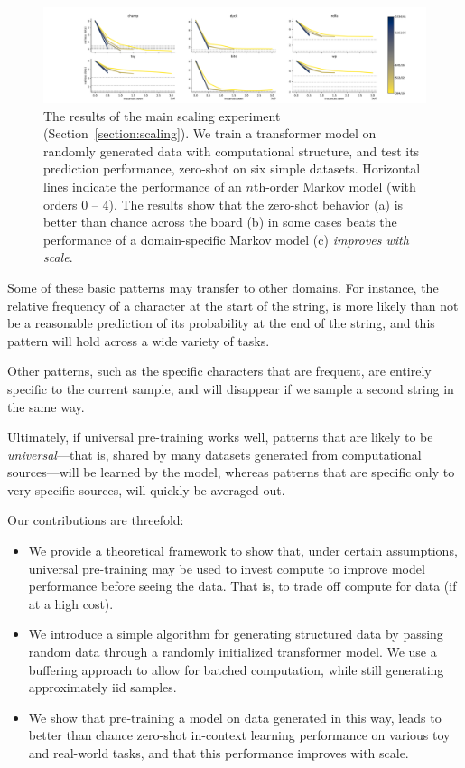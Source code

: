 \documentclass{article} %
\begin{document}
\begin{figure}[t!]

  \centerline{\hspace{-1.2em}
    \includegraphics[width=1.3\textwidth]{./figures/scaling.pdf}
  }
  \caption{The results of the main scaling experiment (Section~\ref{section:scaling}). We train a transformer model on randomly generated data with computational structure, and test its prediction performance, zero-shot on six simple datasets. Horizontal lines indicate the performance of an $n$th-order Markov model (with orders $0$ -- $4$). The results show that the zero-shot behavior (a) is better than chance across the board (b) in some cases beats the performance of a domain-specific Markov model (c) \emph{improves with scale}.}
  \label{figure:scaling}
\end{figure}

Some of these basic patterns may transfer to other domains. For instance, the relative frequency of a character at the start of the string, is more likely than not be a reasonable prediction of its probability at the end of the string, and this pattern will hold across a wide variety of tasks.

 Other patterns, such as the specific characters that are frequent, are entirely specific to the current sample, and will disappear if we sample a second string in the same way.

Ultimately, if universal pre-training works well, patterns that are likely to be \emph{universal}---that is, shared by many datasets generated from computational sources---will be learned by the model, whereas patterns that are specific only to very specific sources, will quickly be averaged out. 

Our contributions are threefold:
\begin{itemize}
\item We provide a theoretical framework to show that, under certain assumptions, universal pre-training may be used to invest compute to improve model performance before seeing the data. That is, to trade off compute for data (if at a high cost). 
\item We introduce a simple algorithm for generating structured data by passing random data through a randomly initialized transformer model. We use a buffering approach to allow for batched computation, while still generating approximately iid samples.
\item We show that pre-training a model on data generated in this way, leads to better than chance zero-shot in-context learning performance on various toy and real-world tasks, and that this performance improves with scale. 
\end{itemize}
\end{document}
